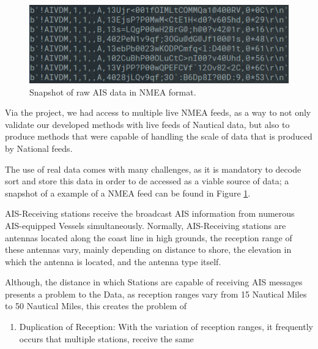 \begin{figure}[H]
	\centering
	\includegraphics[scale = .5]{figures/Ch3/NMEAexample.png}
    \caption{Snapshot of raw AIS data in NMEA format.}
    \label{fig:NMEAexample}
\end{figure}


Via the project, we had access to multiple live NMEA feeds, as a way to not only validate our developed methods with live feeds of Nautical data, but also to produce methods that were capable of handling the scale of data that is produced by National feeds.

The use of real data comes with many challenges, as it is mandatory to decode sort and store this data in order to de accessed as a viable source of data; a snapshot of a example of a NMEA feed can be found in Figure \ref{fig:NMEAexample}. 


AIS-Receiving stations receive the broadcast AIS information from numerous AIS-equipped Vessels simultaneously. Normally, AIS-Receiving stations are antennas located along the coast line in high grounds, the reception range of these antennas vary, mainly depending on distance to shore, the elevation in which the antenna is located, and the antenna type itself.

Although, the distance in which Stations are capable of receiving AIS messages presents a problem to the Data, as reception ranges vary from 15 Nautical Miles to 50 Nautical Miles, this creates the problem of 

\begin{enumerate}
\item Duplication of Reception:  With the variation of reception ranges, it frequently occurs that multiple stations, receive the same  


\end{enumerate}

